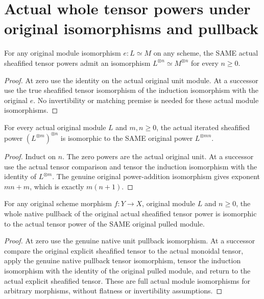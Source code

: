 \section{Actual whole tensor powers under original isomorphisms and pullback}

\begin{lemma}
\label{lem:bundle-tensor-power-isomorphism}
\leanok
{}
For any original module isomorphism $e:L\simeq M$ on any scheme,
the SAME actual sheafified tensor powers admit an isomorphism
$L^{\otimes n}\simeq M^{\otimes n}$ for every $n\geq0$.
\end{lemma}
\begin{proof}
At zero use the identity on the actual original unit module.
At a successor use the true sheafified tensor isomorphism of
the induction isomorphism with the original $e$. No invertibility
or matching premise is needed for these actual module isomorphisms.
\end{proof}

\begin{lemma}
\label{lem:bundle-tensor-power-multiplication}
\leanok
{}
For every actual original module $L$ and $m,n\geq0$, the actual
iterated sheafified power $(L^{\otimes m})^{\otimes n}$ is isomorphic
to the SAME original power $L^{\otimes mn}$.
\end{lemma}
\begin{proof}
Induct on $n$. The zero powers are the actual original unit.
At a successor use the actual tensor comparison and tensor the
induction isomorphism with the identity of $L^{\otimes m}$.
The genuine original power-addition isomorphism gives exponent
$mn+m$, which is exactly $m(n+1)$.
\end{proof}

\begin{lemma}
\label{lem:bundle-tensor-power-pullback}
\leanok
{}
For any original scheme morphism $f:Y\to X$, original module $L$
and $n\geq0$, the whole native pullback of the original actual
sheafified tensor power is isomorphic to the actual tensor power
of the SAME original pulled module.
\end{lemma}
\begin{proof}
At zero use the genuine native unit pullback isomorphism. At a
successor compare the original explicit sheafified tensor to the
actual monoidal tensor, apply the genuine native pullback tensor
isomorphism, tensor the induction isomorphism with the identity
of the original pulled module, and return to the actual explicit
sheafified tensor. These are full actual module isomorphisms for
arbitrary morphisms, without flatness or invertibility assumptions.
\end{proof}
